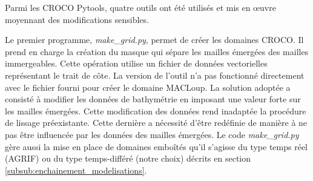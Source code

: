 \documentclass[10pt,a4paper,titlepage]{article}
\begin{document}
Parmi les CROCO Pytools, quatre outils ont été utilisés et mis en \oe{uvre} moyennant des modifications sensibles.

Le premier programme, \textit{make\_grid.py}, permet de créer les domaines CROCO.
Il prend en charge la création du masque qui sépare les mailles émergées des mailles immergeables.
Cette opération utilise un fichier de données vectorielles représentant le trait de côte.
La version de l'outil n'a pas fonctionné directement avec le fichier fourni pour créer le domaine MACLoup.
La solution adoptée a consisté à modifier les données de bathymétrie en imposant une valeur forte sur les mailles émergées.
Cette modification des données rend inadaptée la procédure de lissage préexistante.
Cette dernière a nécessité d'être redéfinie de manière à ne pas être influencée par les données des mailles émergées.
Le code \textit{make\_grid.py} gère aussi la mise en place de domaines emboîtés qu'il s'agisse du type temps réel (AGRIF) ou du type temps-différé (notre choix) décrits en section \ref{subsub:enchainement_modelisations}.
\end{document}
